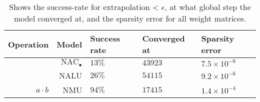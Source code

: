 \begin{table}[H]

\caption{\label{tab:very-simple-function-results}Shows the success-rate for extrapolation < $\epsilon$, at what global step the model converged at, and the sparsity error for all weight matrices.}
\centering
\begin{tabular}{rrlll}
\toprule
Operation & Model & Success rate & Converged at & Sparsity error\\
\midrule
 & ${\mathrm{NAC}_\bullet}$ & $13\%$ & $43923$ & $7.5 \times 10^{-6}$\\

 & NALU & $26\%$ & $54115$ & $9.2 \times 10^{-6}$\\

\multirow{-3}{*}{\raggedleft\arraybackslash ${a \cdot b}$} & NMU & $94\%$ & $17415$ & $1.4 \times 10^{-4}$\\
\bottomrule
\end{tabular}
\end{table}
